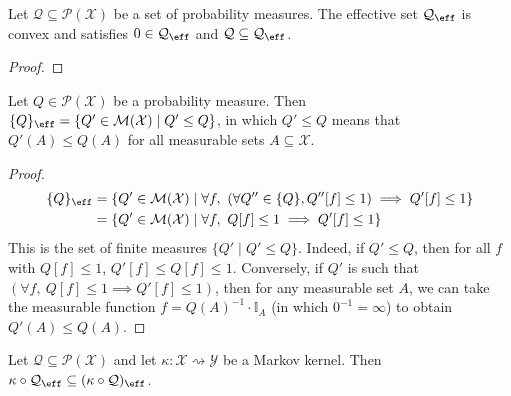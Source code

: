 \begin{lemma}\label{lem:convex_effectiveSet}
  Let $\mathcal{Q} \subseteq \mathcal{P}(\mathcal{X})$ be a set of probability measures.
The effective set $\mathcal{Q}_{\eff}$ is convex and satisfies $0 \in \mathcal{Q}_{\eff}$ and $\mathcal{Q} \subseteq \mathcal{Q}_{\eff}$.
\end{lemma}

\begin{proof}

\end{proof}


\begin{lemma}\label{lem:effectiveSet_singleton}
Let $Q \in \mathcal{P}(\mathcal{X})$ be a probability measure. Then $\{Q\}_{\eff} = \{Q' \in \mathcal{M}(\mathcal{X}) \mid Q' \le Q\}$, in which $Q' \le Q$ means that $Q'(A) \le Q(A)$ for all measurable sets $A \subseteq \mathcal{X}$.
\end{lemma}

\begin{proof}
\begin{align*}
  \{Q\}_{\eff}
  &= \{Q' \in \mathcal{M}(\mathcal{X}) \mid \forall f, \ (\forall Q'' \in \{Q\}, Q''[f] \le 1) \implies Q'[f] \le 1\}
  \\
  &= \{Q' \in \mathcal{M}(\mathcal{X}) \mid \forall f, \ Q[f] \le 1 \implies Q'[f] \le 1\}
\end{align*}
This is the set of finite measures $\{Q' \mid Q' \le Q\}$.
Indeed, if $Q' \le Q$, then for all $f$ with $Q[f] \le 1$, $Q'[f] \le Q[f] \le 1$.
Conversely, if $Q'$ is such that $(\forall f, \ Q[f] \le 1 \implies Q'[f] \le 1)$, then for any measurable set $A$, we can take the measurable function $f = Q(A)^{-1} \cdot \mathbb{I}_A$ (in which $0^{-1} = \infty$) to obtain $Q'(A) \le Q(A)$.
\end{proof}


\begin{lemma}\label{lem:effectiveSet_comp_subset}
Let $\mathcal{Q} \subseteq \mathcal{P}(\mathcal{X})$ and let $\kappa : \mathcal{X} \rightsquigarrow \mathcal{Y}$ be a Markov kernel.
Then $\kappa \circ \mathcal{Q}_{\eff} \subseteq (\kappa \circ \mathcal{Q})_{\eff}$.
\end{lemma}

